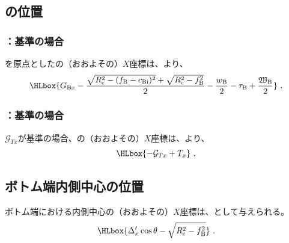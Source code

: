 \subsection{\BottomOutcutCenter の位置}

\subsubsection{\BottomOutcutCenter：\BottomOutcutAsideThickness 基準の場合}
\TableCenter を原点とした\BottomOutcutCenter の（おおよその）$X$座標は、より、
\begin{align*}
  \HLbox{%
    G_{\mathrm Bx}
    -\frac{\sqrt{R_\mathrm c^2-(f_\mathrm B-c_\mathrm{Bi})^2}+\sqrt{R_\mathrm c^2-f_\mathrm B^2}}2
    -\frac{w_\mathrm B}2-\tau_\mathrm B+\frac{\mathfrak W_\mathrm B}2
  }\ .
\end{align*}

\subsubsection{\BottomOutcutCenter：\TopOutcutAsideThickness 基準の場合}
\TopOutcutCenter$\mathcal G_{Tx}$が基準の場合、\BottomOutcutCenter の（おおよその）$X$座標は、より、
\begin{align*}
  \HLbox{-\mathcal G_{Tx}+T_x}\ .
\end{align*}


\subsection{ボトム端内側中心の位置}
ボトム端における内側中心の（おおよその）$X$座標は、\BottomCurvatureCenter{}として与えられる。
\begin{align*}
  \HLbox{\Delta_x'\cos\theta-\sqrt{R_\mathrm c^2-f_\mathrm B^2}}\ .
\end{align*}



